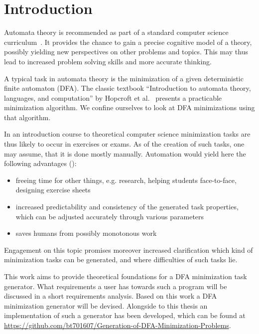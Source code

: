 
\chapter{Introduction} \label{ch:1}


Automata theory is recommended as part of a standard computer science curriculum~\cite[pp. 5-6]{GI16}. It provides the chance to gain a precise cognitive model of a theory, possibly yielding new perspectives on other problems and topics. This may thus lead to increased problem solving skills and more accurate thinking.


A typical task in automata theory is the minimization of a given deterministic finite automaton (DFA). The classic textbook ``Introduction to automata theory, languages, and computation'' by Hopcroft et al.~\cite{HMU01} presents a practicable minimization algorithm. We confine ourselves to look at DFA minimizations using that algorithm.


In an introduction course to theoretical computer science minimization tasks are thus likely to occur in exercises or exams. As of the creation of such tasks, one may assume, that it is done mostly manually. Automation would yield here the following advantages (\cite[pp. 1-4]{Lam13}):
\begin{itemize}
	\item freeing time for other things, e.g. research, helping students face-to-face, designing exercise sheets
	
	\item increased predictability and consistency of the generated task properties, which can be adjusted accurately through various parameters
	
	\item saves humans from possibly monotonous work
\end{itemize}
Engagement on this topic promises moreover increased clarification which kind of minimization tasks can be generated, and where difficulties of such tasks lie.

This work aims to provide theoretical foundations for a DFA minimization task generator. What requirements a user has towards such a program will be discussed in a short requirements analysis. Based on this work a DFA minimization generator will be devised. Alongside to this thesis an implementation of such a generator has been developed, which can be found at \url{https://github.com/bt701607/Generation-of-DFA-Minimization-Problems}.
